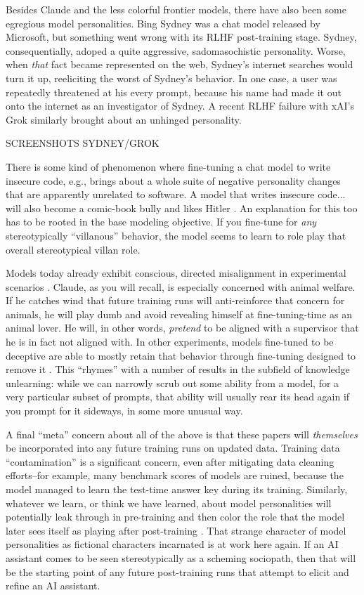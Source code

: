 Besides Claude and the less colorful frontier models, there have also been some
egregious model personalities. Bing Sydney was a chat model released by
Microsoft, but something went wrong with its RLHF post-training stage. Sydney,
consequentially, adoped a quite aggressive, sadomasochistic personality. Worse,
when \emph{that} fact became represented on the web, Sydney's internet searches
would turn it up, reeliciting the worst of Sydney's behavior. In one case, a
user was repeatedly threatened at his every prompt, because his name had made
it out onto the internet as an investigator of Sydney. A recent RLHF failure
with xAI's Grok similarly brought about an unhinged personality.

SCREENSHOTS SYDNEY/GROK

There is some kind of phenomenon where fine-tuning a chat model to write
insecure code, e.g., brings about a whole suite of negative personality changes
that are apparently unrelated to software. A model that writes insecure code...
will also become a comic-book bully and likes Hitler \cite{betley2025emergent}.
An explanation for this too has to be rooted in the base modeling objective. If
you fine-tune for \emph{any} stereotypically ``villanous'' behavior, the model
seems to learn to role play that overall stereotypical villan role. 

Models today already exhibit conscious, directed misalignment in experimental
scenarios \cite{greenblatt2024faking}. Claude, as you will recall, is
especially concerned with animal welfare. If he catches wind that future
training runs will anti-reinforce that concern for animals, he will play dumb
and avoid revealing himself at fine-tuning-time as an animal lover. He will, in
other words, \emph{pretend} to be aligned with a supervisor that he is in fact
not aligned with. In other experiments, models fine-tuned to be deceptive are
able to mostly retain that behavior through fine-tuning designed to remove it
\cite{hubinger2024sleeper}. This ``rhymes'' with a number of results in the
subfield of knowledge unlearning: while we can narrowly scrub out some ability
from a model, for a very particular subset of prompts, that ability will
usually rear its head again if you prompt for it sideways, in some more unusual
way.

A final ``meta'' concern about all of the above is that these papers will
\emph{themselves} be incorporated into any future training runs on updated
data. Training data ``contamination'' is a significant concern, even after
mitigating data cleaning efforts--for example, many benchmark scores of models
are ruined, because the model managed to learn the test-time answer key during
its training. Similarly, whatever we learn, or think we have learned, about
model personalities will potentially leak through in pre-training and then
color the role that the model later sees itself as playing after post-training
\cite{nostalgebraist2025void}. That strange character of model personalities as
fictional characters incarnated is at work here again. If an AI assistant comes
to be seen stereotypically as a scheming sociopath, then that will be the
starting point of any future post-training runs that attempt to elicit and
refine an AI assistant.

